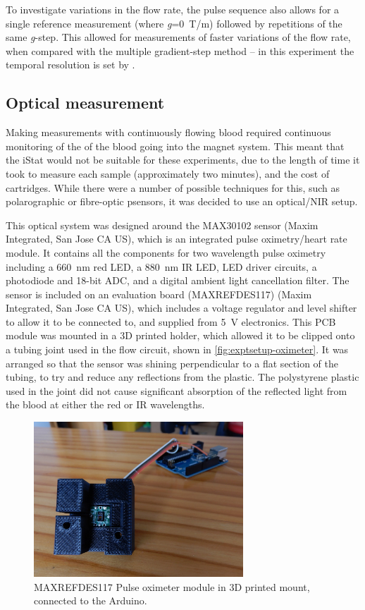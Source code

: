 To investigate variations in the flow rate, the pulse sequence also allows for a single reference measurement (where \textit{g}=\SI{0}{T/m}) followed by repetitions of the same \textit{g}-step.
This allowed for measurements of faster variations of the flow rate, when compared with the multiple gradient-step method -- in this experiment the temporal resolution is set by \TR.

\subsection{Optical \SOtwo measurement}
\label{sec:exptsetup-pulseoximeter}
Making measurements with continuously flowing blood required continuous monitoring of the \SOtwo of the blood going into the magnet system.
This meant that the iStat would not be suitable for these experiments, due to the length of time it took to measure each sample (approximately two minutes), and the cost of cartridges.
While there were a number of possible techniques for this, such as polarographic or fibre-optic p\Otwo sensors, it was decided to use an optical/NIR setup.

This optical system was designed around the MAX30102 sensor (Maxim Integrated, San Jose CA US), which is an integrated pulse oximetry/heart rate module.
It contains all the components for two wavelength pulse oximetry including a \SI{660}{nm} red LED, a \SI{880}{nm} IR LED, LED driver circuits, a photodiode and 18-bit ADC, and a digital ambient light cancellation filter.
The sensor is included on an evaluation board (MAXREFDES117) (Maxim Integrated, San Jose CA US), which includes a voltage regulator and level shifter to allow it to be connected to, and supplied from \SI{5}{V} electronics.
This PCB module was mounted in a 3D printed holder, which allowed it to be clipped onto a tubing joint used in the flow circuit, shown in \autoref{fig:exptsetup-oximeter}.
It was arranged so that the sensor was shining perpendicular to a flat section of the tubing, to try and reduce any reflections from the plastic.
The polystyrene plastic used in the joint did not cause significant absorption of the reflected light from the blood at either the red or IR wavelengths.

\begin{figure}
\centering
\includegraphics[width=0.7\textwidth]{figures/exptsetup/opticalsensor.JPG}
\caption[Optical \SOtwo sensor]{MAXREFDES117 Pulse oximeter module in 3D printed mount, connected to the Arduino.}
\label{fig:exptsetup-oximeter}
\end{figure}

